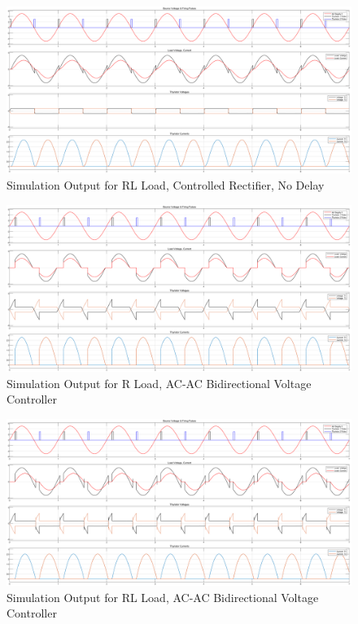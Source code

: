 \documentclass[12pt]{article}
\begin{document}
\begin{figure}[H]
    \centering
    \includegraphics[width=\textwidth]{2RLnd.png}
    \caption{Simulation Output for RL Load, Controlled Rectifier, No Delay}
    \label{fig:rControlledWithDelay}
\end{figure}

\begin{figure}[H]
    \centering
    \includegraphics[width=\textwidth]{3Rd.png}
    \caption{Simulation Output for R Load, AC-AC Bidirectional Voltage Controller}
    \label{fig:rLoad}
\end{figure}

\begin{figure}[H]
    \centering
    \includegraphics[width=\textwidth]{4RLd.png}
    \caption{Simulation Output for RL Load, AC-AC Bidirectional Voltage Controller}
    \label{fig:rlLoad}
\end{figure}
\end{document}
